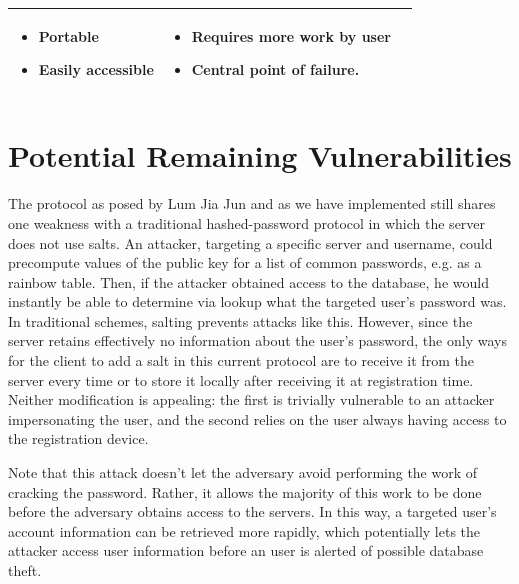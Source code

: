 \documentclass[11pt]{article}
\begin{document}
\begin{center}
\begin{tabular}{|  p{6cm} | p{5cm} | p{5cm} |}
    \begin{itemize}[leftmargin=*]
      \item Portable
      \item Easily accessible
    \end{itemize}

    &

    \begin{itemize}[leftmargin=*]
      \item Requires more work by user
      \item Central point of failure.
    \end{itemize}
    
    \\ \hline
    
    \end{tabular}
\end{center}

\normalsize

\section{Potential Remaining Vulnerabilities}

The protocol as posed by Lum Jia Jun and as we have implemented still shares one weakness with a traditional hashed-password protocol in which the server does not use salts.  An attacker, targeting a specific server and username, could precompute values of the public key for a list of common passwords, e.g. as a rainbow table.  Then, if the attacker obtained access to the database, he would instantly be able to determine via lookup what the targeted user's password was.  In traditional schemes, salting prevents attacks like this.  However, since the server retains effectively no information about the user's password, the only ways for the client to add a salt in this current protocol are to receive it from the server every time or to store it locally after receiving it at registration time.  Neither modification is appealing: the first is trivially vulnerable to an attacker impersonating the user, and the second relies on the user always having access to the registration device.

Note that this attack doesn't let the adversary avoid performing the work of cracking the password.  Rather, it allows the majority of this work to be done before the adversary obtains access to the servers.  In this way, a targeted user's account information can be retrieved more rapidly, which potentially lets the attacker access user information before an user is alerted of possible database theft.
\end{document}
